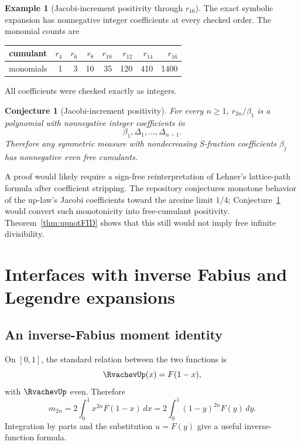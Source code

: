 \documentclass[11pt,oneside]{article}
\newtheorem{conjecture}[theorem]{Conjecture}
\theoremstyle{definition}
\newtheorem{example}[theorem]{Example}
\theoremstyle{remark}
\begin{document}
\begin{example}[Jacobi-increment positivity through \(r_{16}\)]\label{exp:jacobiincrements}
The exact symbolic expansion has nonnegative integer coefficients at every checked order. The monomial counts are
\begin{center}
\begin{tabular}{c|rrrrrrr}
\toprule
cumulant & \(r_4\)&\(r_6\)&\(r_8\)&\(r_{10}\)&\(r_{12}\)&\(r_{14}\)&\(r_{16}\)\\
\midrule
monomials &1&3&10&35&120&410&1400\\
\bottomrule
\end{tabular}
\end{center}
All coefficients were checked exactly as integers.
\end{example}

\begin{conjecture}[Jacobi-increment positivity]\label{conj:jacobiincrements}
For every \(n\ge1\), \(r_{2n}/\beta_1\) is a polynomial with nonnegative integer coefficients in
\[
\beta_1,\Delta_1,\ldots,\Delta_{n-1}.
\]
Therefore any symmetric measure with nondecreasing S-fraction coefficients \(\beta_j\) has nonnegative even free cumulants.
\end{conjecture}

A proof would likely require a sign-free reinterpretation of Lehner's lattice-path formula after coefficient stripping. The repository conjectures monotone behavior of the up-law's Jacobi coefficients toward the arcsine limit \(1/4\); Conjecture~\ref{conj:jacobiincrements} would convert such monotonicity into free-cumulant positivity. Theorem~\ref{thm:upnotFID} shows that this still would not imply free infinite divisibility.

\section{Interfaces with inverse Fabius and Legendre expansions}
\subsection{An inverse-Fabius moment identity}
On \([0,1]\), the standard relation between the two functions is
\begin{equation}\label{eq:upF}
\RvachevUp(x)=F(1-x),
\end{equation}
with \(\RvachevUp\) even. Therefore
\begin{equation}\label{eq:momentF}
m_{2n}=2\int_0^1x^{2n}F(1-x)\,dx
      =2\int_0^1(1-y)^{2n}F(y)\,dy.
\end{equation}
Integration by parts and the substitution \(u=F(y)\) give a useful inverse-function formula.
\end{document}
